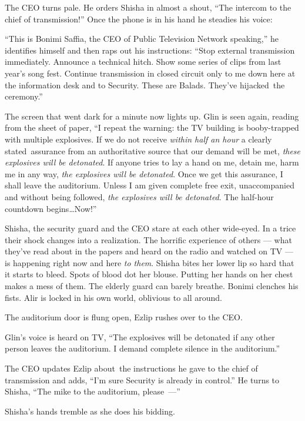 \documentclass[twoside,11pt,openany]{book}
\begin{document}
The CEO turns pale. He orders Shisha in almost a shout, ``The intercom to the
chief of transmission!'' Once the phone is in his hand he steadies his voice:

``This is Bonimi Saffia, the CEO of Public Television Network speaking,'' he identifies
himself and then raps out his instructions: ``Stop external transmission immediately. Announce a technical
hitch. Show some series of clips from last year's song fest. Continue transmission in closed circuit only to me down
here at the information desk and to Security. These are Balads. They've hijacked~the ceremony.''

The screen that went dark for a minute now lights up. Glin is seen again, reading from the sheet of paper,
``I repeat the warning: the TV building is booby-trapped with multiple explosives.  If we do not receive
\textit{within half an hour} a clearly stated~assurance from an authoritative source that our demand will be met,
\textit{these explosives will be detonated}. If anyone tries to lay a hand on me, detain me, harm me in any way,
\textit{the explosives will be detonated}. Once we get this assurance, I shall leave the auditorium. Unless I am given
complete free exit, unaccompanied and without{ }being followed, \textit{the
explosives will be detonated}. The half-hour countdown begins{\ldots}Now!''

Shisha, the security guard and the CEO stare at each other wide-eyed. In a trice their shock changes into a
realization. The horrific experience of others ---  what they've read about in the papers and heard on the radio and
watched on TV  --- is happening right now and here \textit{to them}. Shisha bites her lower lip so hard that it
starts to bleed. Spots of blood dot her blouse. Putting her hands on her chest makes a mess of them. The elderly
guard can barely breathe. Bonimi clenches his fists. Alir is locked in his own world, oblivious to all around.

The auditorium door is flung open, Ezlip rushes over to the CEO.

Glin's voice is heard on TV, ``The explosives will be detonated if any other person leaves the auditorium.
I demand complete silence in the auditorium.''

The CEO updates Ezlip about~the instructions he gave to the chief of transmission and adds, ``I'm sure
Security is already in control.'' He turns to Shisha, ``The mike to the auditorium, please~---''

Shisha's hands tremble as she does his bidding.
\end{document}
